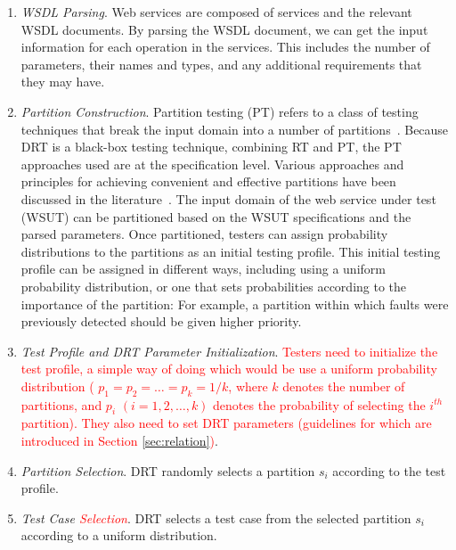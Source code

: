 \documentclass[10pt,journal,compsoc]{IEEEtran}
\begin{document}
\begin{enumerate}[1)]
  \item
  \emph{WSDL Parsing}.
  Web services are composed of services and the relevant WSDL documents.
  By parsing the WSDL document, we can get the input information for each operation in the services.
  This includes the number of parameters, their names and types, and any additional requirements that they may have.

  \item
  \emph{Partition Construction}.
  Partition testing (PT) refers to a class of testing techniques that break the input domain into a number of partitions~\cite{weyuker1991analyzing}.
  Because DRT is a black-box testing technique, combining RT and PT, the PT approaches used are at the specification level.
  Various approaches and principles for achieving convenient and effective partitions have been discussed in the literature~\cite{weyuker1991analyzing, cai2005partition, chen1994relationship, chen1996expected}.
  The input domain of the web service under test (WSUT) can be partitioned based on the WSUT specifications and the parsed parameters.
  Once partitioned, testers can assign probability distributions to the partitions as an initial testing profile.
  This initial testing profile can be assigned in different ways, including using a uniform probability distribution, or one that sets probabilities according to the importance of the partition:
  For example, a partition within which faults were previously detected should be given higher priority.

  \item
  \emph{Test Profile and DRT Parameter Initialization}.
  \textcolor{red}{Testers need to initialize the test profile, a simple way of doing which would be use a uniform probability distribution ( $p_1 = p_2 = \ldots = p_k = 1 / k$, where $k$ denotes the number of partitions, and $p_i$ $(i = 1,2, \ldots, k)$ denotes the probability of selecting the $i^{th}$ partition). They also need to set DRT parameters (guidelines for which are introduced in Section \ref{sec:relation})}.

  \item
  \emph{Partition Selection}.
  DRT randomly selects a partition $s_i$ according to the test profile.

  \item
  \emph{Test Case \textcolor{red}{Selection}}.
  DRT selects a test case from the selected partition $s_i$ according to a uniform distribution.


\end{enumerate}
\end{document}
